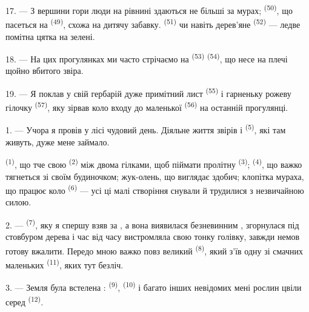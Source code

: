 17. --- З вершини гори люди на рівнині здаються не більші за мурах;
 \textsuperscript{(50)}, що пасеться на 
\textsuperscript{(49)}, схожа на дитячу забавку. 
\textsuperscript{(51)} чи навіть дерев'яне  \textsuperscript{(52)}
--- ледве помітна цятка на зелені.

18. --- На цих прогулянках ми часто стрічаємо на 
\textsuperscript{(53)}  \textsuperscript{(54)}, що несе
на плечі щойно вбитого звіра.

19. --- Я поклав у свій гербарій дуже примітний лист 
\textsuperscript{(55)} і гарненьку рожеву гілочку 
\textsuperscript{(57)}, яку зірвав коло входу до маленької 
\textsuperscript{(56)} на останній прогулянці.

\VUsaut{3.0mm}
\VUsaut{3.0mm}

\VUsaut{3.0mm}

1. --- Учора я провів у лісі чудовий день. Діяльне життя звірів і 
\textsuperscript{(5)}, які там живуть, дуже мене займало.

 \textsuperscript{(1)}, що тче свою 
\textsuperscript{(2)} між двома гілками, щоб піймати пролітну 
\textsuperscript{(3)};  \textsuperscript{(4)}, що важко тягнеться
зі своїм будиночком; жук-олень, що виглядає здобич; клопітка мураха, що працює
коло  \textsuperscript{(6)} --- усі ці малі створіння снували й
трудилися з незвичайною силою.

2. ---  \textsuperscript{(7)}, яку я спершу взяв за ,
а вона виявилася безневинним , згорнулася під стовбуром дерева і
час від часу вистромляла свою тонку голівку, завжди немов готову вжалити. Передо
мною важко повз великий  \textsuperscript{(8)}, який з'їв одну зі
смачних маленьких  \textsuperscript{(11)}, яких тут безліч.

3. --- Земля була встелена : 
\textsuperscript{(9)},  \textsuperscript{(10)} і багато інших
невідомих мені рослин цвіли серед 
\textsuperscript{(12)}.

